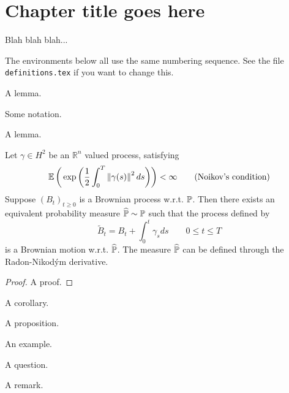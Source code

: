 
\chapter{Chapter title goes here}
\label{chapter1}



Blah blah blah...

The environments below all use the same numbering sequence.  See
the file \verb+definitions.tex+ if you want to change this.\cite{einstein}

\begin{defn}
A lemma.
\end{defn}

\begin{notn}
Some notation.
\end{notn}

\begin{lemma}
A lemma.
\end{lemma}

\begin{theorem}
	Let $\gamma \in H^2$ be an $\mathbb{R}^n$ valued process, satisfying 
	\[
		\E \paren[3]{\exp \paren[3]{\frac{1}{2}\int_{0}^{T} \norm{\gamma(s)}^2 ds }}
		< \infty \tag{Noikov's condition}
	\] 
	Suppose $(B_t)_{t\geq 0}$ is a Brownian process w.r.t. $\P$. Then there exists an
	equivalent probability measure  $\widehat{\P}\sim \P$ such that the process 
	defined by
	\[
	\widetilde{B}_t = B_t + \int_{0}^{t} \gamma_s ds \qquad 0\leq t\leq T 
	\] 
	is a Brownian motion w.r.t. $\widehat{\P}$. The measure $\widehat{\P}$ can
	be defined through the Radon-Nikod\'{y}m  derivative.
\end{theorem}

\begin{proof}
A proof.
\end{proof}

\begin{cor}
A corollary.
\end{cor}

\begin{prop}
A proposition.
\end{prop}

\begin{ex}
An example.
\end{ex}

\begin{question}
A question.
\end{question}

\begin{remark}
A remark.
\end{remark}


